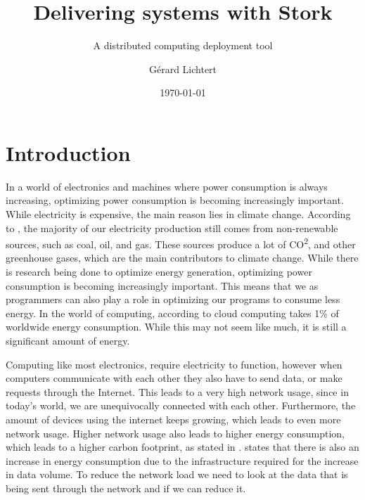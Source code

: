\documentclass[a4paper]{article}
\title{Delivering systems with Stork}
\subtitle{ A distributed computing deployment tool}
\author{Gérard Lichtert}
\date{\today}
\begin{document}
\maketitle
\tableofcontents
\newpage
\raggedright{}


\section{Introduction}
In a world of electronics and machines where power consumption is always increasing, optimizing power consumption is becoming increasingly important. While electricity is expensive, the main reason lies in climate change. According to \cite{owid-energy-mix}, the majority of our electricity production still comes from non-renewable sources, such as coal, oil, and gas. These sources produce a lot of CO\textsuperscript{2}, and other greenhouse gases, which are the main contributors to climate change. While there is research being done to optimize energy generation, optimizing power consumption is becoming increasingly important. This means that we as programmers can also play a role in optimizing our programs to consume less energy. In the world of computing, according to \cite{cloudcomputingenergycrisis} cloud computing takes 1\% of worldwide energy consumption. While this may not seem like much, it is still a significant amount of energy.

Computing like most electronics, require electricity to function, however when computers communicate with each other they also have to send data, or make requests through the Internet. This leads to a very high network usage, since in today's world, we are unequivocally connected with each other. Furthermore, the amount of devices using the internet keeps growing, which leads to even more network usage. Higher network usage also leads to higher energy consumption, which leads to a higher carbon footprint, as stated in \cite{RATHEESH}. \cite{datavolumeeffects} states that there is also an increase in energy consumption due to the infrastructure required for the increase in data volume. To reduce the network load we need to look at the data that is being sent through the network and if we can reduce it.
\end{document}
